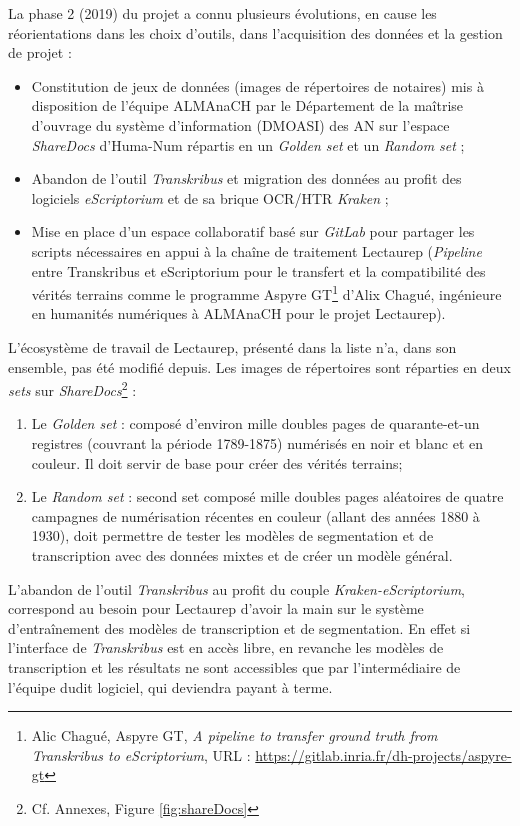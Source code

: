 La phase 2 (2019) du projet a connu plusieurs évolutions, en cause les réorientations dans les choix d'outils, dans l'acquisition des données et la gestion de projet :
\begin{itemize}
    \item Constitution de jeux de données (images de répertoires de notaires) mis à disposition de l'équipe ALMAnaCH par le Département de la maîtrise d’ouvrage du système d'information (DMOASI) des AN sur l'espace \textit{ShareDocs} d'Huma-Num répartis en un \textit{Golden set} et un \textit{Random set} ;
    \item Abandon de l'outil \textit{Transkribus} et migration des données au profit des logiciels \textit{eScriptorium} et de sa brique OCR/HTR \textit{Kraken} ;
    \item Mise en place d'un espace collaboratif basé sur \textit{GitLab} pour partager les scripts nécessaires en appui à la chaîne de traitement Lectaurep (\textit{Pipeline} entre Transkribus et eScriptorium pour le transfert et la compatibilité des vérités terrains comme le programme Aspyre GT\footnote{Alic Chagué, Aspyre GT, \textit{A pipeline to transfer ground truth from Transkribus to eScriptorium}, URL : \url{https://gitlab.inria.fr/dh-projects/aspyre-gt}} d'Alix Chagué, ingénieure en humanités numériques à ALMAnaCH pour le projet Lectaurep).
\end{itemize}
\bigskip
L'écosystème de travail de Lectaurep, présenté dans la liste n'a, dans son ensemble, pas été modifié depuis. Les images de répertoires sont réparties en deux \textit{sets} sur \textit{ShareDocs}\footnote{Cf. Annexes, Figure \ref{fig:shareDocs}} :
\begin{enumerate}
    \item Le \textit{Golden set} :  composé d'environ mille doubles pages de quarante-et-un registres (couvrant la période 1789-1875) numérisés en noir et blanc et en couleur. Il doit servir de base pour créer des vérités terrains;
    \item Le \textit{Random set} : second set composé mille doubles pages aléatoires de quatre campagnes de numérisation récentes en couleur (allant des années 1880 à 1930), doit permettre de tester les modèles de segmentation et de transcription avec des données mixtes et de créer un modèle général.
\end{enumerate}
\newpage
L'abandon de l'outil \textit{Transkribus} au profit du couple \textit{Kraken-eScriptorium}, correspond au besoin pour Lectaurep d'avoir la main sur le système d'entraînement des modèles de transcription et de segmentation. En effet si l'interface de \textit{Transkribus} est en accès libre, en revanche les modèles de transcription et les résultats ne sont accessibles que par l'intermédiaire de l'équipe dudit logiciel, qui deviendra payant à terme.\\ 


